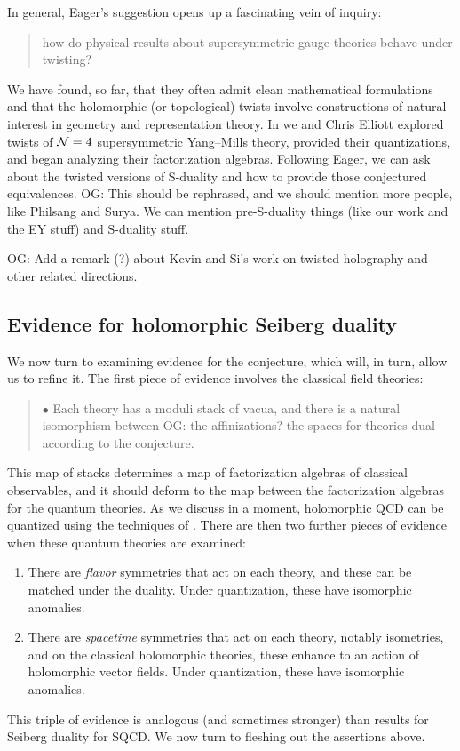 \documentclass[11pt]{amsart}
\def\owen#1{{\textcolor{violet!65!black}{OG: {#1}}}}
\begin{document}
In general, Eager's suggestion opens up a fascinating vein of inquiry:
\begin{quote}
how do physical results about supersymmetric gauge theories behave under twisting?
\end{quote}
We have found, so far, that they often admit clean mathematical formulations and that the holomorphic (or topological) twists involve constructions of natural interest in geometry and representation theory.
In \cite{EGW} we and Chris Elliott explored twists of $\mathcal N=4$ supersymmetric Yang--Mills theory,
provided their quantizations, and began analyzing their factorization algebras.
Following Eager, we can ask about the twisted versions of S-duality and how to provide those conjectured equivalences.
\owen{This should be rephrased, and we should mention more people, like Philsang and Surya. We can mention pre-S-duality things (like our work and the EY stuff) and S-duality stuff.}

\owen{Add a remark (?) about Kevin and Si's work on twisted holography and other related directions.}

\subsection{Evidence for holomorphic Seiberg duality}

We now turn to examining evidence for the conjecture, which will, in turn, allow us to refine it.
The first piece of evidence involves the classical field theories:
\begin{quote}
$\bullet$ Each theory has a moduli stack of vacua, and there is a natural isomorphism between \owen{the affinizations?} the spaces for theories dual according to the conjecture.
\end{quote}
This map of stacks determines a map of factorization algebras of classical observables,
and it should deform to the map between the factorization algebras for the quantum theories.
As we discuss in a moment, holomorphic QCD can be quantized using the techniques of \cite{BW work}.
There are then two further pieces of evidence when these quantum theories are examined:
\begin{enumerate}
\item There are {\em flavor} symmetries that act on each theory, and these can be matched under the duality. Under quantization, these have isomorphic anomalies.
\item There are {\em spacetime} symmetries that act on each theory, notably isometries, and on the classical holomorphic theories, these enhance to an action of holomorphic vector fields. Under quantization, these have isomorphic anomalies.
\end{enumerate}
This triple of evidence is analogous (and sometimes stronger) than results for Seiberg duality for SQCD. 
We now turn to fleshing out the assertions above.
\end{document}
